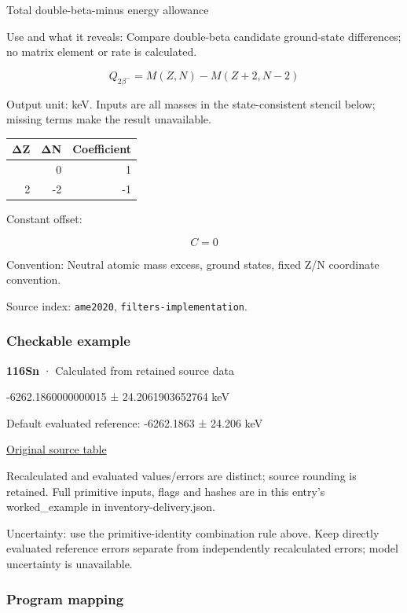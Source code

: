 \documentclass[
  11pt,
  letterpaper,
]{article}
\begin{document}
Total double-beta-minus energy allowance

Use and what it reveals: Compare double-beta candidate ground-state
differences; no matrix element or rate is calculated.

\[
Q_{2\beta^-}=M(Z,N)-M(Z+2,N-2)
\]

Output unit: keV. Inputs are all masses in the state-consistent stencil
below; missing terms make the result unavailable.

\begin{longtable}[]{@{}rrr@{}}
\toprule\noalign{}
ΔZ & ΔN & Coefficient \\
\midrule\noalign{}
\endhead
\bottomrule\noalign{}
\endlastfoot
0 & 0 & 1 \\
2 & -2 & -1 \\
\end{longtable}

Constant offset:

\[
C=0
\]

Convention: Neutral atomic mass excess, ground states, fixed Z/N
coordinate convention.

Source index: \texttt{ame2020}, \texttt{filters-implementation}.

\subsubsection{Checkable example}\label{checkable-example-10}

\textbf{116Sn} · Calculated from retained source data

-6262.1860000000015 ± 24.2061903652764 keV

Default evaluated reference: -6262.1863 ± 24.206 keV

\href{https://www-nds.iaea.org/amdc/ame2020/rct1.mas20.txt}{Original
source table}

Recalculated and evaluated values/errors are distinct; source rounding
is retained. Full primitive inputs, flags and hashes are in this entry's
worked\_example in inventory-delivery.json.

Uncertainty: use the primitive-identity combination rule above. Keep
directly evaluated reference errors separate from independently
recalculated errors; model uncertainty is unavailable.

\subsubsection{Program mapping}\label{program-mapping-10}
\end{document}
